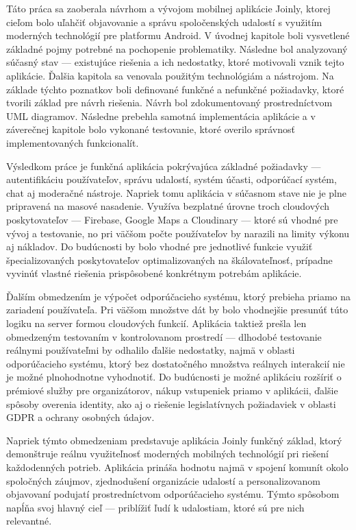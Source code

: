 Táto práca sa zaoberala návrhom a vývojom mobilnej aplikácie Joinly, ktorej cieľom bolo uľahčiť objavovanie a správu spoločenských udalostí s využitím moderných technológií pre platformu Android.                                                                                                                                                                                                                                                                   
  V úvodnej kapitole boli vysvetlené základné pojmy potrebné na pochopenie problematiky. Následne bol analyzovaný súčasný stav — existujúce riešenia a ich nedostatky, ktoré motivovali vznik tejto aplikácie. Ďalšia kapitola sa   
  venovala použitým technológiám a nástrojom. Na základe týchto poznatkov boli definované funkčné a nefunkčné požiadavky, ktoré tvorili základ pre návrh riešenia. Návrh bol zdokumentovaný prostredníctvom UML diagramov. Následne 
  prebehla samotná implementácia aplikácie a v záverečnej kapitole bolo vykonané testovanie, ktoré overilo správnosť implementovaných funkcionalít.

  Výsledkom práce je funkčná aplikácia pokrývajúca základné požiadavky — autentifikáciu používateľov, správu udalostí, systém účasti, odporúčací systém, chat aj moderačné nástroje. Napriek tomu aplikácia v súčasnom stave nie je 
  plne pripravená na masové nasadenie. Využíva bezplatné úrovne troch cloudových poskytovateľov — Firebase, Google Maps a Cloudinary — ktoré sú vhodné pre vývoj a testovanie, no pri väčšom počte používateľov by narazili na      
  limity výkonu aj nákladov. Do budúcnosti by bolo vhodné pre jednotlivé funkcie využiť špecializovaných poskytovateľov optimalizovaných na škálovateľnosť, prípadne vyvinúť vlastné riešenia prispôsobené konkrétnym potrebám      
  aplikácie.

  Ďalším obmedzením je výpočet odporúčacieho systému, ktorý prebieha priamo na zariadení používateľa. Pri väčšom množstve dát by bolo vhodnejšie presunúť túto logiku na server formou cloudových funkcií. Aplikácia taktiež prešla 
  len obmedzeným testovaním v kontrolovanom prostredí — dlhodobé testovanie reálnymi používateľmi by odhalilo ďalšie nedostatky, najmä v oblasti odporúčacieho systému, ktorý bez dostatočného množstva reálnych interakcií nie je  
  možné plnohodnotne vyhodnotiť. Do budúcnosti je možné aplikáciu rozšíriť o prémiové služby pre organizátorov, nákup vstupeniek priamo v aplikácii, ďalšie spôsoby overenia identity, ako aj o riešenie legislatívnych požiadaviek 
  v oblasti GDPR a ochrany osobných údajov.

  Napriek týmto obmedzeniam predstavuje aplikácia Joinly funkčný základ, ktorý demonštruje reálnu využiteľnosť moderných mobilných technológií pri riešení každodenných potrieb. Aplikácia prináša hodnotu najmä v spojení komunít  
  okolo spoločných záujmov, zjednodušení organizácie udalostí a personalizovanom objavovaní podujatí prostredníctvom odporúčacieho systému. Týmto spôsobom napĺňa svoj hlavný cieľ — priblížiť ľudí k udalostiam, ktoré sú pre nich 
  relevantné.
